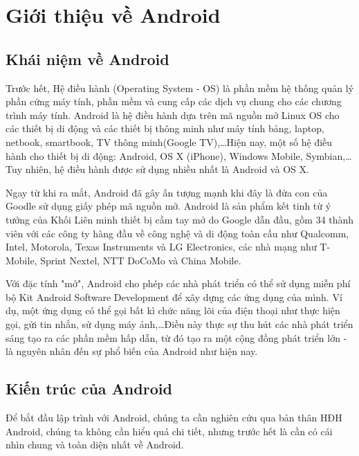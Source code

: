 \section{Giới thiệu về Android}

\subsection{Khái niệm về Android}
Trước hết, Hệ điều hành (Operating System - OS) là phần mềm hệ thống quản lý phần cứng máy tính, phần mềm và cung cấp các dịch vụ chung cho các chương trình máy tính.
Android là hệ điều hành dựa trên mã nguồn mở Linux OS cho các thiết bị di động và các thiết bị thông minh như máy tính bảng, laptop, netbook, smartbook, TV thông minh(Google TV),\dots Hiện nay, một số hệ điều hành cho thiết bị di động: Android, OS X (iPhone), Windows Mobile, Symbian,\dots Tuy nhiên, hệ điều hành được sử dụng nhiều nhất là Android và OS X.

Ngay từ khi ra mắt, Android đã gây ấn tượng mạnh khi đây là đứa con của Goodle sử dụng giấy phép mã nguồn mở. Android là sản phẩm kết tinh từ ý tưởng của Khối Liên minh thiết bị cầm tay mở do Google dẫn đầu, gồm 34 thành viên với các công ty hàng đầu về công nghệ và di động toàn cầu như Qualcomm, Intel, Motorola, Texas Instruments và LG Electronics, các nhà mạng như T-Mobile, Sprint Nextel, NTT DoCoMo và China Mobile.

Với đặc tính "mở", Android cho phép các nhà phát triển có thể sử dụng miễn phí bộ Kit Android Software Development để xây dựng các ứng dụng của mình. Ví dụ, một ứng dụng có thể gọi bất kì chức năng lõi của điện thoại như thực hiện gọi, gửi tin nhắn, sử dụng máy ảnh,\dots Điều này thực sự thu hút các nhà phát triển sáng tạo ra các phần mềm hấp dẫn, từ đó tạo ra một cộng đồng phát triển lớn - là nguyên nhân đến sự phổ biến của Android như hiện nay.

\subsection{Kiến trúc của Android}
Để bắt đầu lập trình với Android, chúng ta cần nghiên cứu qua bản thân HĐH Android, chúng ta không cần hiểu quá chi tiết, nhưng trước hết là cần có cái nhìn chung và toàn diện nhất về Android.


